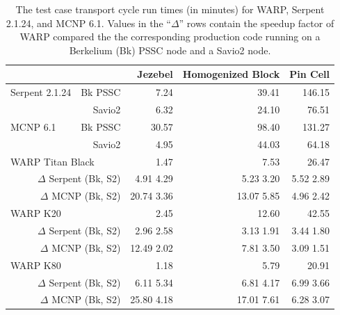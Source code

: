 \documentclass[preprint,12pt]{elsarticle}
\begin{document}
\begin{table}[h]
\centering
\caption{The test case transport cycle run times (in minutes) for WARP, Serpent 2.1.24, and MCNP 6.1.  Values in the ``$\Delta$'' rows contain the speedup factor of WARP compared the the corresponding production code running on a Berkelium (Bk) PSSC node and a Savio2 node.}
\label{results_table_times}
\scriptsize
\begin{tabular}{| l r | r | r | r |}
\cline{3-5}
\multicolumn{2}{c|}{}                            & Jezebel     & Homogenized Block & Pin Cell     \\
\hline                          
Serpent 2.1.24   &    Bk PSSC                    & 7.24        & 39.41             & 146.15       \\
                 &    Savio2                     & 6.32        & 24.10             & 76.51        \\
\hline                                        
MCNP 6.1         &    Bk PSSC                    &  30.57      & 98.40             & 131.27       \\
                 &    Savio2                     &   4.95      & 44.03             & 64.18        \\
\hline                          
\multicolumn{2}{|l|}{WARP Titan Black}           &  1.47       & 7.53              &  26.47       \\
\multicolumn{2}{|r|}{$\Delta$ Serpent (Bk, S2)}  & 4.91  4.29  & 5.23  3.20        &  5.52  2.89  \\
\multicolumn{2}{|r|}{$\Delta$ MCNP    (Bk, S2)}  & 20.74 3.36  & 13.07 5.85        &  4.96  2.42  \\
\hline
\multicolumn{2}{|l|}{WARP K20}                   & 2.45         & 12.60            & 42.55        \\
\multicolumn{2}{|r|}{$\Delta$ Serpent (Bk, S2)}  & 2.96  2.58   & 3.13  1.91       & 3.44  1.80   \\
\multicolumn{2}{|r|}{$\Delta$ MCNP    (Bk, S2)}  & 12.49 2.02   & 7.81  3.50       & 3.09  1.51   \\
\hline
\multicolumn{2}{|l|}{WARP K80}                   & 1.18         & 5.79             & 20.91        \\
\multicolumn{2}{|r|}{$\Delta$ Serpent (Bk, S2)}  & 6.11  5.34   & 6.81  4.17       & 6.99  3.66   \\
\multicolumn{2}{|r|}{$\Delta$ MCNP    (Bk, S2)}  & 25.80 4.18   & 17.01 7.61       & 6.28  3.07   \\
\hline
\end{tabular}


\end{table}
\end{document}
